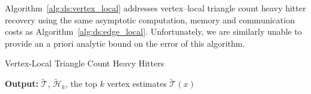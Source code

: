 \documentclass{vldb}
\newcommand{\push}[1]{\text{push} \left ( #1 \right )}
\newcommand{\algoname}[1]{\textnormal{\textsc{#1}}}
\begin{document}
Algorithm~\ref{alg:ds:vertex_local} addresses vertex--local triangle count heavy hitter recovery using the same asymptotic computation, memory and communication costs as Algorithm~\ref{alg:ds:edge_local}.
Unfortunately, we are similarly unable to provide an a priori analytic bound on the error of this algorithm. 

\begin{algorithm}[t] 
\caption{Vertex-Local Triangle Count Heavy Hitters}\label{alg:ds:vertex_local}
\begin{flushleft}
        \textbf{Output:} $\widetilde{\mathcal{T}}$, $\widetilde{\mathcal{H}}_k$, the top $k$ vertex estimates $\widetilde{\mathcal{T}}(x)$
\end{flushleft}
\begin{flushleft}
\begin{algorithmic}[1]

\end{algorithmic}
\end{flushleft}
\end{algorithm}
\end{document}
